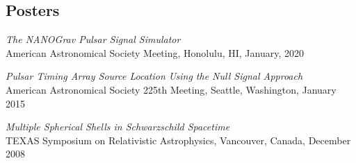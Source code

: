 \documentclass[11pt,letterpaper,sans,unicode]{moderncv}
\newcommand{\talkitem}[3]{\item \textit{#1}\\{#2}, #3} %
\begin{document}
\subsection{Posters}
\begin{etaremune}[leftmargin=8mm]
\small
\talkitem{The NANOGrav Pulsar Signal Simulator}{American Astronomical Society Meeting}{Honolulu, HI, January, 2020}
\talkitem{Pulsar Timing Array Source Location Using the Null Signal Approach}{American Astronomical Society 225th Meeting}{Seattle, Washington, January 2015}
\talkitem{Multiple Spherical Shells in Schwarzschild Spacetime}{TEXAS Symposium on Relativistic Astrophysics}{Vancouver, Canada, December 2008}
\end{etaremune}
\end{document}
